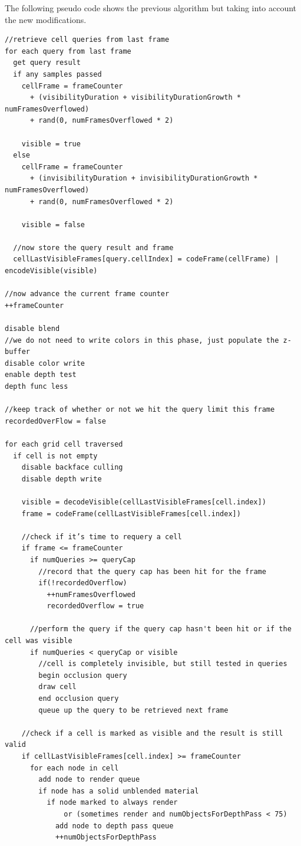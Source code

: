 \documentclass[12pt]{ucthesis}
\begin{document}
The following pseudo code shows the previous algorithm but taking into account the new modifications.
\begin{lstlisting}
//retrieve cell queries from last frame
for each query from last frame
  get query result
  if any samples passed
    cellFrame = frameCounter 
      + (visibilityDuration + visibilityDurationGrowth * numFramesOverflowed) 
      + rand(0, numFramesOverflowed * 2)

    visible = true
  else
    cellFrame = frameCounter 
      + (invisibilityDuration + invisibilityDurationGrowth * numFramesOverflowed) 
      + rand(0, numFramesOverflowed * 2)
    
    visible = false

  //now store the query result and frame
  cellLastVisibleFrames[query.cellIndex] = codeFrame(cellFrame) | encodeVisible(visible)

//now advance the current frame counter
++frameCounter

disable blend
//we do not need to write colors in this phase, just populate the z-buffer
disable color write
enable depth test
depth func less

//keep track of whether or not we hit the query limit this frame
recordedOverFlow = false

for each grid cell traversed
  if cell is not empty
    disable backface culling
    disable depth write

    visible = decodeVisible(cellLastVisibleFrames[cell.index])
    frame = codeFrame(cellLastVisibleFrames[cell.index]) 

    //check if it’s time to requery a cell
    if frame <= frameCounter
      if numQueries >= queryCap
        //record that the query cap has been hit for the frame
        if(!recordedOverflow)
          ++numFramesOverflowed
          recordedOverflow = true

      //perform the query if the query cap hasn't been hit or if the cell was visible
      if numQueries < queryCap or visible
        //cell is completely invisible, but still tested in queries
        begin occlusion query
        draw cell
        end occlusion query
        queue up the query to be retrieved next frame

    //check if a cell is marked as visible and the result is still valid
    if cellLastVisibleFrames[cell.index] >= frameCounter
      for each node in cell
        add node to render queue
        if node has a solid unblended material
          if node marked to always render 
              or (sometimes render and numObjectsForDepthPass < 75)
            add node to depth pass queue
            ++numObjectsForDepthPass


\end{lstlisting}
\end{document}
